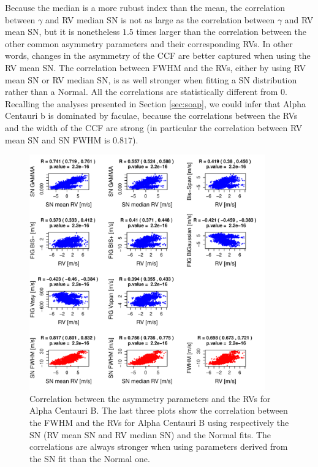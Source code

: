 \documentclass[11pt, oneside]{article}
\begin{document}
{Because the median is a more rubust index than the mean, the correlation between $\gamma$ and RV median SN is not as large as the correlation between $\gamma$ and RV mean SN, but it is nonetheless $1.5$ times larger than the correlation between the other common asymmetry parameters and their corresponding RVs. In other words, changes in the asymmetry of the CCF are better captured when using the RV mean SN. The correlation between FWHM and the RVs, either by using RV mean SN or RV median SN, is as well stronger when fitting a SN distribution rather than a Normal. All the correlations are statistically different from $0$. Recalling the analyses presented in Section \ref{sec:soap}, we could infer that Alpha Centauri b is dominated by faculae, because the correlations between the RVs and the width of the CCF are strong (in particular the correlation between RV mean SN and SN FWHM is $0.817$).
%
\begin{figure}[htbp]
   \centering
\includegraphics[height = 4in]{HD12862_[4]Comparison_para.pdf}  
   \caption{Correlation between the asymmetry parameters and the RVs for Alpha Centauri B. The last three plots show the correlation between the FWHM and the RVs for Alpha Centauri B using respectively the SN (RV mean SN and RV median SN) and the Normal fits. The correlations are always stronger when using parameters derived from the SN fit than the Normal one.}
   \label{fig:alphacent:corrPlot}
\end{figure}
%

}
\end{document}
